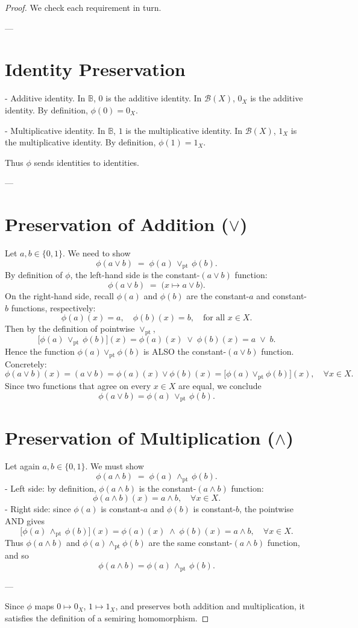 \documentclass{article}
\begin{document}
\begin{proof}
We check each requirement in turn.

---

\section*{Identity Preservation}

- Additive identity.  In $\mathbb B$, $0$ is the additive identity.  In $\mathcal B(X)$, $0_X$ is the additive identity.  By definition, $\phi(0)=0_X$.

- Multiplicative identity.  In $\mathbb B$, $1$ is the multiplicative identity.  In $\mathcal B(X)$, $1_X$ is the multiplicative identity.  By definition, $\phi(1)=1_X$.

Thus $\phi$ sends identities to identities.

---

\section{Preservation of Addition ($\vee$)}

Let $a,b\in\{0,1\}$.  We need to show
\[
  \phi(a\vee b)
  \;=\;
  \phi(a)\,\vee_{\mathrm{pt}}\,\phi(b).
\]
By definition of $\phi$, the left-hand side is the constant-$(a\vee b)$ function:
\[
  \phi(a\vee b) \;=\; 
  \bigl(x\mapsto a\vee b\bigr).
\]
On the right-hand side, recall $\phi(a)$ and $\phi(b)$ are the constant-$a$ and constant-$b$ functions, respectively:
\[
  \phi(a)(x) = a,
  \quad
  \phi(b)(x) = b,
  \quad
  \text{for all }x\in X.
\]
Then by the definition of pointwise $\vee_{\mathrm{pt}}$,
\[
  \bigl[\phi(a)\,\vee_{\mathrm{pt}}\,\phi(b)\bigr](x)
  = \phi(a)(x)\;\vee\;\phi(b)(x)
  = a \;\vee\; b.
\]
Hence the function $\phi(a)\vee_{\mathrm{pt}}\phi(b)$ is ALSO the constant-$(a\vee b)$ function.  Concretely:
\[
  \phi(a\vee b)(x)
  = (a\vee b)
  = \phi(a)(x)\vee \phi(b)(x)
  = \bigl[\phi(a)\vee_{\mathrm{pt}}\phi(b)\bigr](x),
  \quad \forall x\in X.
\]
Since two functions that agree on every $x\in X$ are equal, we conclude
\[
  \phi(a\vee b)
  = \phi(a)\,\vee_{\mathrm{pt}}\,\phi(b).
\]

\section{Preservation of Multiplication ($\wedge$)}

Let again $a,b\in\{0,1\}$.  We must show
\[
  \phi(a\wedge b)
  \;=\;
  \phi(a)\,\wedge_{\mathrm{pt}}\,\phi(b).
\]
- Left side: by definition, $\phi(a\wedge b)$ is the constant-$(a\wedge b)$ function:
  \[
    \phi(a\wedge b)(x) = a\wedge b,\quad\forall x\in X.
  \]
- Right side: since $\phi(a)$ is constant-$a$ and $\phi(b)$ is constant-$b$, the pointwise AND gives
  \[
    \bigl[\phi(a)\,\wedge_{\mathrm{pt}}\,\phi(b)\bigr](x)
    = \phi(a)(x)\;\wedge\;\phi(b)(x)
    = a\wedge b,
    \quad \forall x\in X.
  \]
Thus $\phi(a\wedge b)$ and $\phi(a)\wedge_{\mathrm{pt}}\phi(b)$ are the same constant-$(a\wedge b)$ function, and so
\[
  \phi(a\wedge b)
  = \phi(a)\,\wedge_{\mathrm{pt}}\,\phi(b).
\]

---

Since $\phi$ maps $0\mapsto0_X$, $1\mapsto1_X$, and preserves both addition and multiplication, it satisfies the definition of a semiring homomorphism.
\end{proof}
\end{document}
